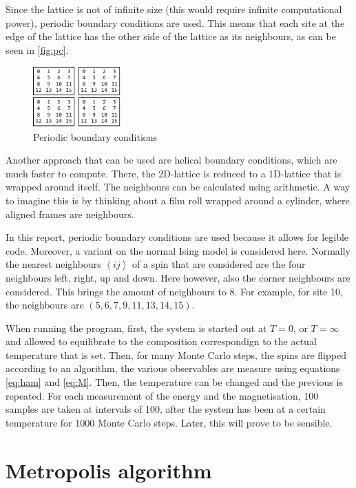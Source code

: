 \documentclass[a4paper]{article}
\begin{document}
Since the lattice is not of infinite size (this would require infinite computational power), periodic boundary conditions are used.  This means that each site at the edge of the lattice has the other side of the lattice as its neighbours, as can be seen in \autoref{fig:pc}.
\begin{figure}[h]
	\centering
	\includegraphics[width=0.3\textwidth]{latimage.pdf}
	\caption{Periodic boundary conditions}
	\label{fig:pc}
\end{figure}
Another approach that can be used are helical boundary conditions, which are much faster to compute. There, the 2D-lattice is reduced to a 1D-lattice that is wrapped around itself. The neighbours can be calculated using arithmetic. A way to imagine this is by thinking about a film roll wrapped around a cylinder, where aligned frames are neighbours.

In this report, periodic boundary conditions are used because it allows for legible code. Moreover, a variant on the normal Ising model is considered here. Normally the nearest neighbours $\left<ij\right>$ of a spin that are considered are the four neighbours left, right, up and down. Here however, also the corner neighbours are considered. This brings the amount of neighbours to 8. For example, for site 10, the neighbours are $(5,6,7,9,11,13,14,15)$.

When running the program, first, the system is started out at $T=0$, or $T=\infty$ and allowed to equilibrate to the composition correspondign to the actual temperature that is set. Then, for many Monte Carlo steps, the spins are flipped according to an algorithm, the various observables are measure using equations \ref{eq:ham} and \ref{eq:M}. Then, the temperature can be changed and the previous is repeated. 
For each measurement of the energy and the magnetisation, 100 samples are taken at intervals of 100, after the system has been at a certain temperature for 1000 Monte Carlo steps. Later, this will prove to be sensible.

\section{Metropolis algorithm}
\end{document}
